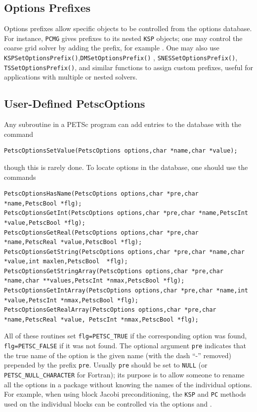 {{\subsection{Options Prefixes}
Options prefixes allow specific objects to be controlled from the options database.
For instance, \lstinline{PCMG} gives prefixes to its nested \lstinline{KSP} objects;
one may control the coarse grid solver by adding the  prefix, for example 
.
One may also use \break \lstinline{KSPSetOptionsPrefix()},\lstinline{DMSetOptionsPrefix()}
, \lstinline{SNESSetOptionsPrefix()}, \lstinline{TSSetOptionsPrefix()}, and similar 
functions to assign custom prefixes, useful for applications with multiple or nested 
solvers.

\subsection{User-Defined PetscOptions}

Any subroutine in a PETSc program can add entries to the database with the
command
\begin{lstlisting}
PetscOptionsSetValue(PetscOptions options,char *name,char *value);
\end{lstlisting}
though this is rarely done.
To locate options in the database, one should use the
commands
\begin{lstlisting}
PetscOptionsHasName(PetscOptions options,char *pre,char *name,PetscBool *flg);
PetscOptionsGetInt(PetscOptions options,char *pre,char *name,PetscInt *value,PetscBool *flg);
PetscOptionsGetReal(PetscOptions options,char *pre,char *name,PetscReal *value,PetscBool *flg);
PetscOptionsGetString(PetscOptions options,char *pre,char *name,char *value,int maxlen,PetscBool  *flg);
PetscOptionsGetStringArray(PetscOptions options,char *pre,char *name,char **values,PetscInt *nmax,PetscBool *flg);
PetscOptionsGetIntArray(PetscOptions options,char *pre,char *name,int *value,PetscInt *nmax,PetscBool *flg);
PetscOptionsGetRealArray(PetscOptions options,char *pre,char *name,PetscReal *value, PetscInt *nmax,PetscBool *flg);
\end{lstlisting}
All of
these
routines set \lstinline{flg=PETSC_TRUE} if the corresponding option was found, \lstinline{flg=PETSC_FALSE} if it
was not found.  The optional argument
\lstinline{pre} indicates that the true name of the option is the given name
(with the dash ``-'' removed) prepended by the prefix \lstinline{pre}.
Usually \lstinline{pre} should be set to \lstinline{NULL} (or \lstinline{PETSC_NULL_CHARACTER}
for Fortran); its purpose is to
allow someone to rename all the options in a package without knowing
the names of the individual options.  For example, when using block
Jacobi preconditioning, the \lstinline{KSP} and \lstinline{PC} methods used on the individual
blocks can be controlled via the options  and . 

}}
